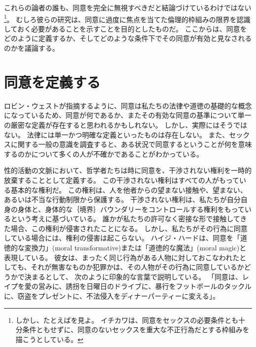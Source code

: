\documentclass[paper=a4,book,openany]{jlreq}
\newcommand{\ig}[1]{}           %
\begin{document}
これらの論者の誰も、同意を完全に無視すべきだと結論づけているわけではない\footnote{しかし、たとえば\citet{ichikawa20:_presup_consen}を見よ。
イチカワは、同意をセックスの必要条件とも十分条件ともせずに、同意のないセックスを重大な不正行為だとする枠組みを描こうとしている。
\nocite{ichikawa20:_presup_consen}}。
むしろ彼らの研究は、同意に過度に焦点を当てた倫理的枠組みの限界を認識しておく必要があることを示すことを目的としたものだ。
ここからは、同意をどのように定義するか、そしてどのような条件下でその同意が有効と見なされるのかを議論する。

\section{同意を定義する}

ロビン・ウェスト\ig{Robin West}が指摘するように、同意は私たちの法律や道徳の基礎的な概念になっているため、同意が何であるか、またその有効な同意の基準について単一の厳密な定義が存在すると思われるかもしれない。
しかし、実際にはそうではない。
法律には単一かつ明確な定義といったものは存在しない。
また、セックスに関する一般の意識を調査すると、ある状況で同意するということが何を意味するのかについて多くの人が不確かであることがわかっている\citep[pp.462-463]{muehlenhard16:_compl_sexual_consen_colleg_studen}。

性的活動の文脈において、哲学者たちは時に同意を、干渉されない権利を一時的放棄することとして定義する。
この干渉されない権利はすべての人がもっている基本的な権利だ。
この権利は、人を他者からの望まない接触や、望まない、あるいは不当な行動制限から保護する。
干渉されない権利は、私たちが自分自身の身体と、身体的な｛境界｝{バウンダリー}をコントロールする権利をもっているという考えに基づいている。
誰かが私たちの許可なく密接な形で接触してきた場合、この権利が侵害されたことになる。
しかし、私たちがその行為に同意している場合には、権利の侵害は起こらない。
ハイジ・ハード\ig{Hurd}は、同意を「道徳的な変換力」(moral transformative)または「道徳的な魔法」(moral magic)と表現している。
彼女は、まったく同じ行為がある人物に対しておこなわれたとしても、それが無害なものか犯罪かは、その人物がその行為に同意しているかどうかで決まるとして、
次のように印象的な言葉で説明している。
「同意は、レイプを愛の営みに、誘拐を日曜日のドライブに、暴行をフットボールのタックルに、窃盗をプレゼントに、不法侵入をディナーパーティーに変える」\citep[pp.503-504]{hurd05:_blamin_victim}。
\end{document}
